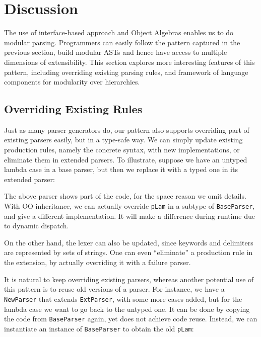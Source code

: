 \section{Discussion}\label{sec:discussion}

The use of interface-based approach and Object Algebras enables us to do modular parsing. Programmers can easily follow the pattern
captured in the previous section, build modular ASTs and hence have access to multiple dimensions of extensibility. This section
explores more interesting features of this pattern, including overriding existing parsing rules, and framework of language components
for modularity over hierarchies.

\subsection{Overriding Existing Rules}

Just as many parser generators do, our pattern also supports overriding part of existing parsers easily, but in a type-safe way.
We can simply update existing production rules, namely the concrete syntax, with new implementations, or eliminate them in extended parsers.
To illustrate, suppose we have an untyped lambda case in a base parser, but then we replace it with a typed one in its extended parser:

The above parser shows part of the code, for the space reason we omit details. With OO inheritance, we can actually override \lstinline{pLam}
in a subtype of \lstinline{BaseParser}, and give a different implementation. It will make a difference during runtime due to dynamic
dispatch.

On the other hand, the lexer can also be updated, since keywords and delimiters are represented by sets of strings.
One can even ``eliminate'' a production rule in the extension, by actually overriding it with a failure parser.

It is natural to keep overriding existing parsers, whereas another potential use of this pattern is to reuse old versions of a parser. For instance,
we have a \lstinline{NewParser} that extends \lstinline{ExtParser}, with some more cases added, but for the lambda case we want to go back to the untyped one.
It can be done by copying the code from \lstinline{BaseParser} again, yet does not achieve code reuse. Instead, we can instantiate an instance of \lstinline{BaseParser} to obtain the old \lstinline{pLam}:

